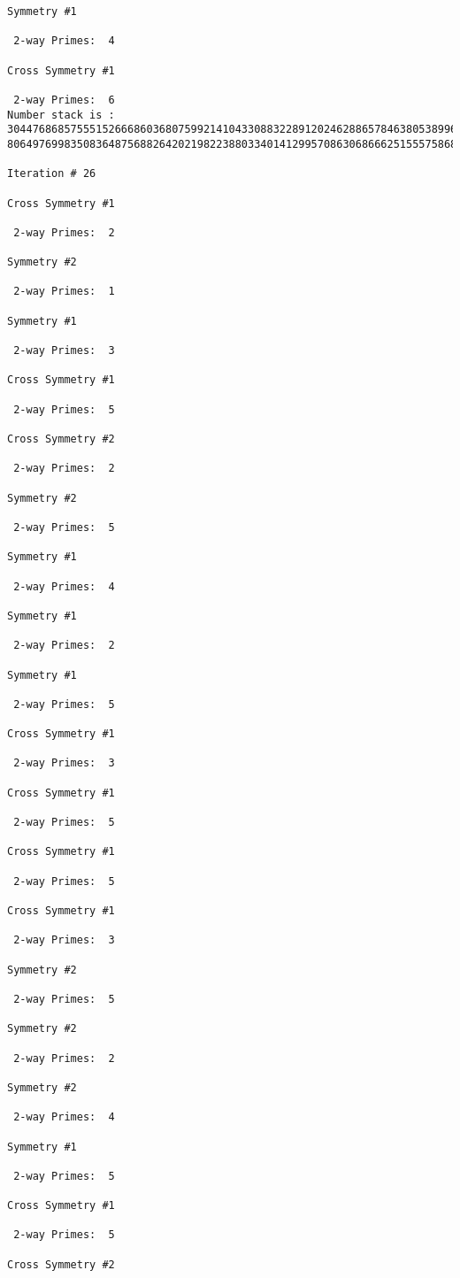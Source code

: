 \begin{verbatim}
Symmetry #1

 2-way Primes: 	4

Cross Symmetry #1

 2-way Primes: 	6
Number stack is :
30447686857555152666860368075992141043308832289120246288657846380538996794608835958544046240163340857
80649769983508364875688264202198223880334014129957086306866625155575868674403758043361042640445859538

Iteration #	26

Cross Symmetry #1

 2-way Primes: 	2

Symmetry #2

 2-way Primes: 	1

Symmetry #1

 2-way Primes: 	3

Cross Symmetry #1

 2-way Primes: 	5

Cross Symmetry #2

 2-way Primes: 	2

Symmetry #2

 2-way Primes: 	5

Symmetry #1

 2-way Primes: 	4

Symmetry #1

 2-way Primes: 	2

Symmetry #1

 2-way Primes: 	5

Cross Symmetry #1

 2-way Primes: 	3

Cross Symmetry #1

 2-way Primes: 	5

Cross Symmetry #1

 2-way Primes: 	5

Cross Symmetry #1

 2-way Primes: 	3

Symmetry #2

 2-way Primes: 	5

Symmetry #2

 2-way Primes: 	2

Symmetry #2

 2-way Primes: 	4

Symmetry #1

 2-way Primes: 	5

Cross Symmetry #1

 2-way Primes: 	5

Cross Symmetry #2


\end{verbatim}

